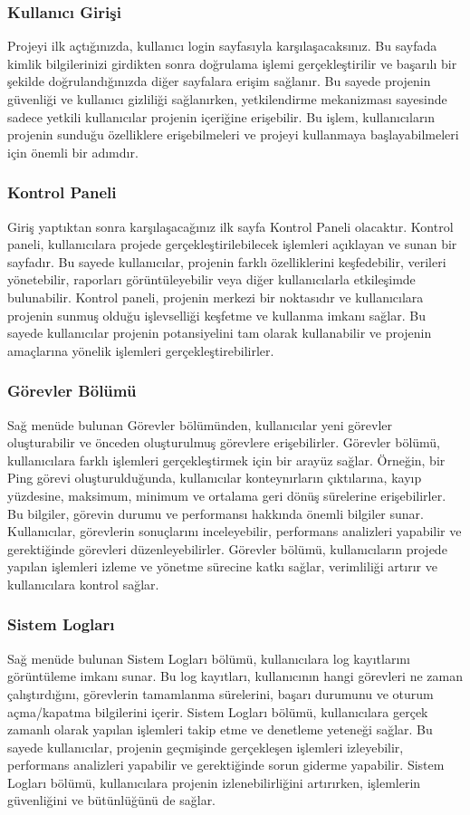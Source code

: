 \subsubsection{Kullanıcı Girişi}
Projeyi ilk açtığınızda, kullanıcı login sayfasıyla karşılaşacaksınız. Bu sayfada kimlik bilgilerinizi girdikten sonra doğrulama işlemi gerçekleştirilir ve başarılı bir şekilde doğrulandığınızda diğer sayfalara erişim sağlanır. Bu sayede projenin güvenliği ve kullanıcı gizliliği sağlanırken, yetkilendirme mekanizması sayesinde sadece yetkili kullanıcılar projenin içeriğine erişebilir. Bu işlem, kullanıcıların projenin sunduğu özelliklere erişebilmeleri ve projeyi kullanmaya başlayabilmeleri için önemli bir adımdır.
\subsubsection{Kontrol Paneli}

Giriş yaptıktan sonra karşılaşacağınız ilk sayfa Kontrol Paneli olacaktır. Kontrol paneli, kullanıcılara projede gerçekleştirilebilecek işlemleri açıklayan ve sunan bir sayfadır. Bu sayede kullanıcılar, projenin farklı özelliklerini keşfedebilir, verileri yönetebilir, raporları görüntüleyebilir veya diğer kullanıcılarla etkileşimde bulunabilir. Kontrol paneli, projenin merkezi bir noktasıdır ve kullanıcılara projenin sunmuş olduğu işlevselliği keşfetme ve kullanma imkanı sağlar. Bu sayede kullanıcılar projenin potansiyelini tam olarak kullanabilir ve projenin amaçlarına yönelik işlemleri gerçekleştirebilirler.
\subsubsection{Görevler Bölümü}
Sağ menüde bulunan Görevler bölümünden, kullanıcılar yeni görevler oluşturabilir ve önceden oluşturulmuş görevlere erişebilirler. Görevler bölümü, kullanıcılara farklı işlemleri gerçekleştirmek için bir arayüz sağlar. Örneğin, bir Ping görevi oluşturulduğunda, kullanıcılar konteynırların çıktılarına, kayıp yüzdesine, maksimum, minimum ve ortalama geri dönüş sürelerine erişebilirler. Bu bilgiler, görevin durumu ve performansı hakkında önemli bilgiler sunar. Kullanıcılar, görevlerin sonuçlarını inceleyebilir, performans analizleri yapabilir ve gerektiğinde görevleri düzenleyebilirler. Görevler bölümü, kullanıcıların projede yapılan işlemleri izleme ve yönetme sürecine katkı sağlar, verimliliği artırır ve kullanıcılara kontrol sağlar.
\subsubsection{Sistem Logları}
Sağ menüde bulunan Sistem Logları bölümü, kullanıcılara log kayıtlarını görüntüleme imkanı sunar. Bu log kayıtları, kullanıcının hangi görevleri ne zaman çalıştırdığını, görevlerin tamamlanma sürelerini, başarı durumunu ve oturum açma/kapatma bilgilerini içerir. Sistem Logları bölümü, kullanıcılara gerçek zamanlı olarak yapılan işlemleri takip etme ve denetleme yeteneği sağlar. Bu sayede kullanıcılar, projenin geçmişinde gerçekleşen işlemleri izleyebilir, performans analizleri yapabilir ve gerektiğinde sorun giderme yapabilir. Sistem Logları bölümü, kullanıcılara projenin izlenebilirliğini artırırken, işlemlerin güvenliğini ve bütünlüğünü de sağlar.
